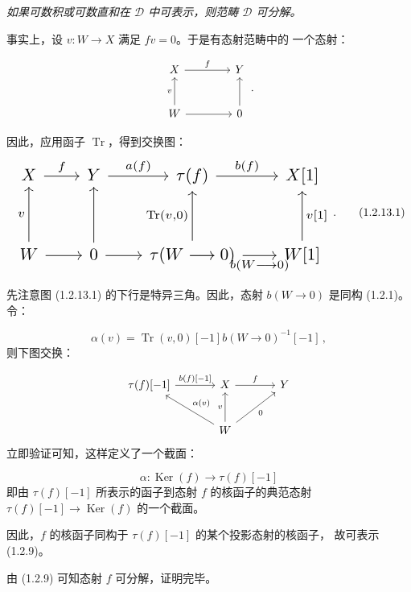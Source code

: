 \clearpage
{}%
\begingroup
\small
\setlength{\emergencystretch}{1.5em}%
\setlength{\abovedisplayskip}{4pt plus 2pt minus 2pt}%
\setlength{\belowdisplayskip}{4pt plus 2pt minus 2pt}%

\textit{如果可数积或可数直和在 $\mathcal D$ 中可表示，则范畴
$\mathcal D$ 可分解。}

事实上，设 $v\colon W\longrightarrow X$ 满足 $fv=0$。于是有态射范畴中的
一个态射：

\[
  \begin{tikzcd}[column sep=4em,row sep=2.5em]
    X \arrow[r,"f"] & Y \\
    W \arrow[u,"v"] \arrow[r] & 0 \arrow[u]
  \end{tikzcd}
  \,.
\]

因此，应用函子 $\operatorname{Tr}$，得到交换图：
\begin{equation}
  \resizebox{0.82\linewidth}{!}{%
    $\begin{tikzcd}[ampersand replacement=\&,column sep=2.05em,row sep=3em]
      X \arrow[r,"f"]
        \& Y \arrow[r,"{a(f)}"]
        \& \tau(f) \arrow[r,"{b(f)}"]
        \& X[1] \\
      W \arrow[u,"v"] \arrow[r]
        \& 0 \arrow[u] \arrow[r]
        \& \tau(W\longrightarrow 0) \arrow[u,"{\operatorname{Tr}(v,0)}"]
          \arrow[r,"{b(W\longrightarrow 0)}"']
        \& W[1] \arrow[u,"{v[1]}"']
    \end{tikzcd}$%
  }\,.
  \tag{1.2.13.1}
\end{equation}

先注意图 (1.2.13.1) 的下行是特异三角。因此，态射
$b(W\longrightarrow 0)$ 是同构 (1.2.1)。令：

\[
  \alpha(v)=\operatorname{Tr}(v,0)[-1]
  b(W\longrightarrow 0)^{-1}[-1]\,,
\]
则下图交换：

\[
  \begin{tikzcd}[column sep=3.5em,row sep=2.4em]
    \tau(f)[-1] \arrow[r,"{b(f)[-1]}"]
      & X \arrow[r,"f"]
      & Y \\
      & W \arrow[ul,"{\alpha(v)}"'] \arrow[u,"v"] \arrow[ur,"0"']
  \end{tikzcd}
\]
立即验证可知，这样定义了一个截面：
\par

\[
  \alpha\colon \operatorname{Ker}(f)\longrightarrow \tau(f)[-1]
\]
\noindent 即由 $\tau(f)[-1]$ 所表示的函子到态射 $f$ 的核函子的典范态射
$\tau(f)[-1]\longrightarrow\operatorname{Ker}(f)$ 的一个截面。

因此，$f$ 的核函子同构于 $\tau(f)[-1]$ 的某个投影态射的核函子，
故可表示 (1.2.9)。

由 (1.2.9) 可知态射 $f$ 可分解，证明完毕。
\endgroup
